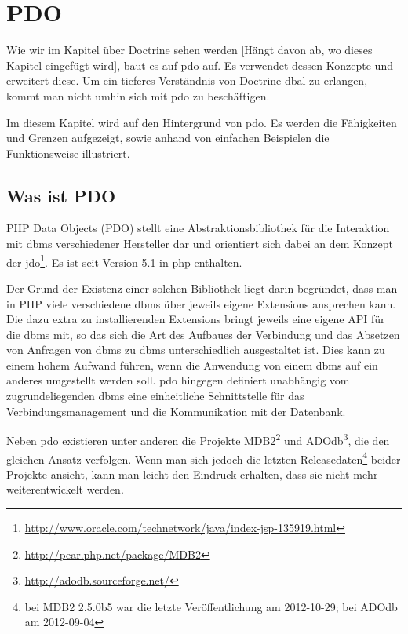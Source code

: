 \section{PDO}
Wie wir im Kapitel über Doctrine sehen werden [Hängt davon ab, wo dieses Kapitel eingefügt wird], baut es auf \gls{pdo} auf. Es verwendet dessen Konzepte und erweitert diese. Um ein tieferes Verständnis von Doctrine \gls{dbal} zu erlangen, kommt man nicht umhin sich mit \gls{pdo} zu beschäftigen.

Im diesem Kapitel wird auf den Hintergrund von \gls{pdo}. Es werden die Fähigkeiten und Grenzen aufgezeigt, sowie anhand von einfachen Beispielen die Funktionsweise illustriert.

\subsection{Was ist PDO}
PHP Data Objects (PDO) stellt eine Abstraktionsbibliothek für die Interaktion mit \gls{dbms} verschiedener Hersteller dar und orientiert sich dabei an dem Konzept der \gls{jdo}\footnote{\url{http://www.oracle.com/technetwork/java/index-jsp-135919.html}}. Es ist seit Version 5.1 in \gls{php} enthalten.

Der Grund der Existenz einer solchen Bibliothek liegt darin begründet, dass man in PHP viele verschiedene \gls{dbms} über jeweils eigene Extensions ansprechen kann. Die dazu extra zu installierenden Extensions bringt jeweils eine eigene API für die \gls{dbms} mit, so das sich die Art des Aufbaues der Verbindung und das Absetzen von Anfragen von \gls{dbms} zu \gls{dbms} unterschiedlich ausgestaltet ist.
Dies kann zu einem hohem Aufwand führen, wenn die Anwendung von einem \gls{dbms} auf ein anderes umgestellt werden soll. \gls{pdo} hingegen definiert unabhängig vom zugrundeliegenden \gls{dbms} eine einheitliche Schnittstelle für das Verbindungsmanagement und die Kommunikation mit der Datenbank.

Neben \gls{pdo} existieren unter anderen die Projekte  MDB2\footnote{\url{http://pear.php.net/package/MDB2}} und ADOdb\footnote{\url{http://adodb.sourceforge.net/}}, die den gleichen Ansatz verfolgen. Wenn man sich jedoch die letzten Releasedaten\footnote{bei MDB2 2.5.0b5 war die letzte Veröffentlichung am 2012-10-29; bei ADOdb am 2012-09-04} beider Projekte ansieht, kann man leicht den Eindruck erhalten, dass sie nicht mehr weiterentwickelt werden.

